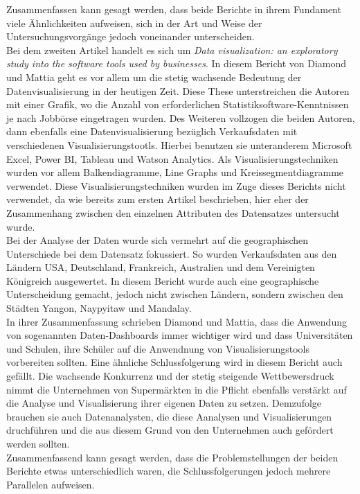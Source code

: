 \documentclass[usegeometry=true]{scrartcl}
\begin{document}
Zusammenfassen kann gesagt werden, dass beide Berichte in ihrem Fundament viele Ähnlichkeiten aufweisen, sich in der Art und Weise der Untersuchungsvorgänge jedoch voneinander
unterscheiden.\\
\noindent Bei dem zweiten Artikel handelt es sich um \textit{Data visualization: an exploratory study into the software tools used by businesses}.\cite{diamond2017data}
In diesem Bericht von Diamond und Mattia geht es vor allem um die stetig wachsende Bedeutung der Datenvisualisierung in der heutigen Zeit. Diese These unterstreichen die Autoren
mit einer Grafik, wo die Anzahl von erforderlichen Statistiksoftware-Kenntnissen je nach Jobbörse eingetragen wurden. Des Weiteren vollzogen die beiden Autoren, dann ebenfalls
eine Datenvisualisierung bezüglich Verkaufsdaten mit verschiedenen Visualisierungstootls. Hierbei benutzen sie unteranderem Microsoft Excel, Power BI, Tableau und
Watson Analytics. Als Visualisierungstechniken wurden vor allem Balkendiagramme, Line Graphs und Kreissegmentdiagramme verwendet. Diese Visualisierungstechniken wurden im Zuge
dieses Berichts nicht verwendet, da wie bereits zum ersten Artikel beschrieben, hier eher der Zusammenhang zwischen den einzelnen Attributen des Datensatzes untersucht wurde.\\
Bei der Analyse der Daten wurde sich vermehrt auf die geographischen Unterschiede bei dem Datensatz fokussiert. So wurden Verkaufsdaten aus den Ländern USA, Deutschland,
Frankreich, Australien und dem Vereinigten Königreich ausgewertet. In diesem Bericht wurde auch eine geographische Unterscheidung gemacht, jedoch nicht zwischen Ländern,
sondern zwischen den Städten Yangon, Naypyitaw und Mandalay.
\\ In ihrer Zusammenfassung schrieben Diamond und Mattia, dass die Anwendung von sogenannten Daten-Dashboards immer wichtiger wird und dass Universitäten und Schulen, ihre Schüler
auf die Anwendnung von Visualisierungstools vorbereiten sollten. Eine ähnliche Schlussfolgerung wird in diesem Bericht auch gefällt. Die wachsende Konkurrenz und der stetig steigende
Wettbewersdruck nimmt die Unternehmen von Supermärkten in die Pflicht ebenfalls verstärkt auf die Analyse und Visualisierung ihrer eigenen Daten zu setzen. Demzufolge brauchen
sie auch Datenanalysten, die diese Aanalysen und Visualisierungen druchführen und die aus diesem Grund von den Unternehmen auch gefördert werden sollten.\\
Zusammenfassend kann gesagt werden, dass die Problemstellungen der beiden Berichte etwas unterschiedlich waren, die Schlussfolgerungen jedoch mehrere Parallelen aufweisen.
\end{document}
